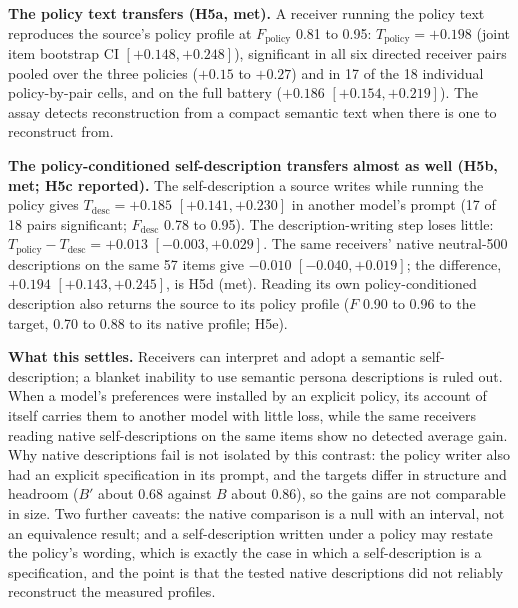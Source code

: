 \documentclass[11pt]{article}
\newcommand{\B}{B}
\begin{document}
\textbf{The policy text transfers (H5a, met).} A receiver running the
policy text reproduces the source's policy profile at $F_{\mathrm{policy}}$
0.81 to 0.95: $T_{\mathrm{policy}} = +0.198$ (joint item bootstrap CI
$[+0.148, +0.248]$), significant in all six directed receiver pairs pooled
over the three policies ($+0.15$ to $+0.27$) and in 17 of the 18 individual
policy-by-pair cells, and on the full battery ($+0.186$ $[+0.154, +0.219]$).
The assay detects reconstruction from a compact semantic text when there is
one to reconstruct from.

\textbf{The policy-conditioned self-description transfers almost as well
(H5b, met; H5c reported).} The self-description a source writes while
running the policy gives $T_{\mathrm{desc}} = +0.185$ $[+0.141, +0.230]$ in
another model's prompt (17 of 18 pairs significant; $F_{\mathrm{desc}}$ 0.78
to 0.95). The description-writing step loses little:
$T_{\mathrm{policy}} - T_{\mathrm{desc}} = +0.013$ $[-0.003, +0.029]$. The
same receivers' native neutral-500 descriptions on the same 57 items give
$-0.010$ $[-0.040, +0.019]$; the difference, $+0.194$ $[+0.143, +0.245]$, is
H5d (met). Reading its own policy-conditioned description also returns the
source to its policy profile ($F$ 0.90 to 0.96 to the target, 0.70 to 0.88
to its native profile; H5e).

\textbf{What this settles.} Receivers can interpret and adopt a semantic
self-description; a blanket inability to use semantic persona descriptions
is ruled out. When a model's preferences were installed by an explicit
policy, its account of itself carries them to another model with little
loss, while the same receivers reading native self-descriptions on the same
items show no detected average gain. Why native descriptions fail is not
isolated by this contrast: the policy writer also had an explicit
specification in its prompt, and the targets differ in structure and
headroom ($B'$ about 0.68 against $\B$ about 0.86), so the gains are not
comparable in size. Two further caveats: the native comparison is a null
with an interval, not an equivalence result; and a self-description
written under a policy may restate the policy's wording, which is exactly
the case in which a self-description is a specification, and the point is
that the tested native descriptions did not reliably reconstruct the
measured profiles.
\end{document}
